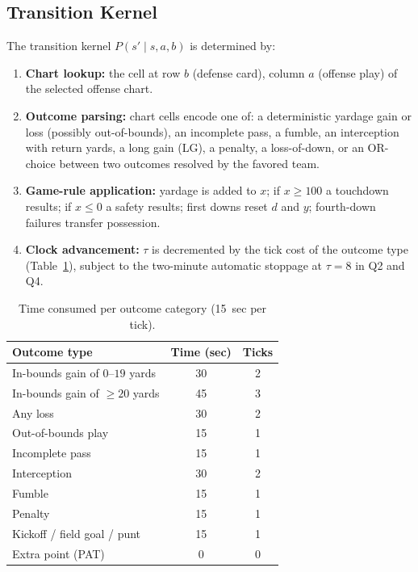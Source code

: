 \documentclass[11pt,letterpaper]{article}
\begin{document}
\subsection{Transition Kernel}

The transition kernel $P(s' \mid s, a, b)$ is determined by:
\begin{enumerate}
  \item \textbf{Chart lookup:} the cell at row $b$ (defense card), column $a$ (offense
        play) of the selected offense chart.
  \item \textbf{Outcome parsing:} chart cells encode one of: a deterministic yardage gain
        or loss (possibly out-of-bounds), an incomplete pass, a fumble, an interception with
        return yards, a long gain (LG), a penalty, a loss-of-down, or an OR-choice between
        two outcomes resolved by the favored team.
  \item \textbf{Game-rule application:} yardage is added to $x$; if $x \geq 100$ a
        touchdown results; if $x \leq 0$ a safety results; first downs reset $d$ and $y$;
        fourth-down failures transfer possession.
  \item \textbf{Clock advancement:} $\tau$ is decremented by the tick cost of the outcome
        type (Table~\ref{tab:ticks}), subject to the two-minute automatic stoppage at
        $\tau = 8$ in Q2 and Q4.
\end{enumerate}

\begin{table}[ht]
\centering
\caption{Time consumed per outcome category (15~sec per tick).}
\label{tab:ticks}
\begin{tabular}{lcc}
\toprule
Outcome type & Time (sec) & Ticks \\
\midrule
In-bounds gain of $0$--$19$ yards & 30 & 2 \\
In-bounds gain of $\geq 20$ yards & 45 & 3 \\
Any loss & 30 & 2 \\
Out-of-bounds play & 15 & 1 \\
Incomplete pass & 15 & 1 \\
Interception & 30 & 2 \\
Fumble & 15 & 1 \\
Penalty & 15 & 1 \\
Kickoff / field goal / punt & 15 & 1 \\
Extra point (PAT) & 0 & 0 \\
\bottomrule
\end{tabular}
\end{table}
\end{document}
